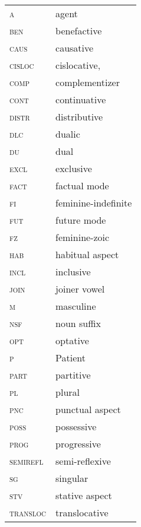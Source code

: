 \documentclass[output=paper]{langscibook}
\begin{document}
\begin{tabularx}{.45\textwidth}[t]{lQ}
\textsc{a}        &   agent\\
\textsc{ben}      &   benefactive\\
\textsc{caus}     &    causative\\
\textsc{cisloc}   &    cislocative,\\
\textsc{comp}     &  complementizer\\
\textsc{cont}     &    continuative\\
\textsc{distr}    &   distributive\\
\textsc{dlc}      &   dualic\\
\textsc{du}       &  dual\\            
\textsc{excl}     &    exclusive\\
\textsc{fact}     &    factual mode\\
\textsc{fi}       &    feminine-indefinite\\
\textsc{fut}      &   future mode\\
\textsc{fz}       &    feminine-zoic\\
\textsc{hab}      &   habitual aspect\\
\textsc{incl}     &    inclusive\\
\textsc{join}     &    joiner vowel\\
\textsc{m}        &   masculine\\
\textsc{nsf}      &   noun suffix\\
\textsc{opt}      &   optative\\
\textsc{p}        &   Patient\\
\textsc{part}     &    partitive\\
\textsc{pl}       &    plural\\
\textsc{pnc}      &   punctual aspect\\
\textsc{poss}     &    possessive\\
\textsc{prog}     &    progressive\\
\textsc{semirefl} &  semi-reflexive\\
\textsc{sg}       & singular\\
\textsc{stv}      & stative aspect\\
\textsc{transloc} & translocative\\
\end{tabularx}


{\sloppy\printbibliography[heading=subbibliography,notkeyword=this]}
\end{document}
